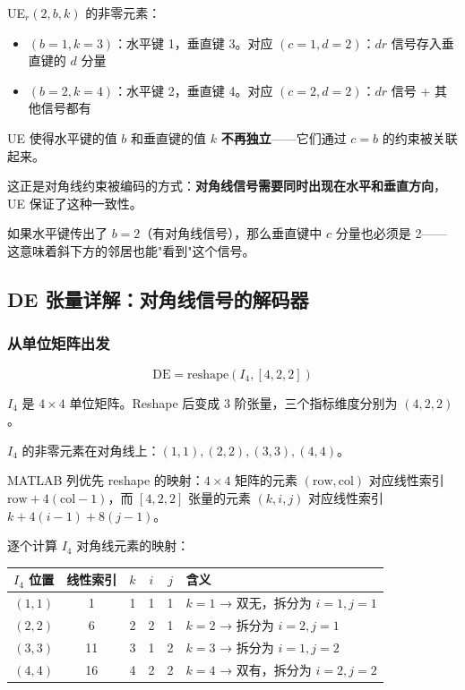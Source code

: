 \documentclass[12pt,a4paper]{article}
\begin{document}
\begin{exbox}[具体例子：当 $dr = 2$（有对角线信号，这里有皇后！）时]
UE$_r(2, b, k)$ 的非零元素：
\begin{itemize}
  \item $(b{=}1, k{=}3)$：水平键 1，垂直键 3。对应 $(c{=}1, d{=}2)$：$dr$ 信号存入垂直键的 $d$ 分量
  \item $(b{=}2, k{=}4)$：水平键 2，垂直键 4。对应 $(c{=}2, d{=}2)$：$dr$ 信号 + 其他信号都有
\end{itemize}
\end{exbox}

\begin{warnbox}
UE 使得水平键的值 $b$ 和垂直键的值 $k$ \textbf{不再独立}——它们通过 $c = b$ 的约束被关联起来。

这正是对角线约束被编码的方式：\textbf{对角线信号需要同时出现在水平和垂直方向}，UE 保证了这种一致性。

如果水平键传出了 $b=2$（有对角线信号），那么垂直键中 $c$ 分量也必须是 2——这意味着斜下方的邻居也能"看到"这个信号。
\end{warnbox}

\subsection{DE 张量详解：对角线信号的解码器}

\subsubsection{从单位矩阵出发}

$$\text{DE} = \text{reshape}(I_4, [4, 2, 2])$$

$I_4$ 是 $4 \times 4$ 单位矩阵。Reshape 后变成 3 阶张量，三个指标维度分别为 $(4, 2, 2)$。

$I_4$ 的非零元素在对角线上：$(1,1), (2,2), (3,3), (4,4)$。

MATLAB 列优先 reshape 的映射：$4 \times 4$ 矩阵的元素 $(\text{row}, \text{col})$ 对应线性索引 $\text{row} + 4(\text{col}-1)$，而 $[4,2,2]$ 张量的元素 $(k, i, j)$ 对应线性索引 $k + 4(i-1) + 8(j-1)$。

逐个计算 $I_4$ 对角线元素的映射：

\begin{center}
\begin{tabular}{c|c|ccc|l}
\toprule
$I_4$ 位置 & 线性索引 & $k$ & $i$ & $j$ & 含义 \\
\midrule
$(1,1)$ & 1 & 1 & 1 & 1 & $k{=}1$ → 双无，拆分为 $i{=}1, j{=}1$ \\
$(2,2)$ & 6 & 2 & 2 & 1 & $k{=}2$ → 拆分为 $i{=}2, j{=}1$ \\
$(3,3)$ & 11 & 3 & 1 & 2 & $k{=}3$ → 拆分为 $i{=}1, j{=}2$ \\
$(4,4)$ & 16 & 4 & 2 & 2 & $k{=}4$ → 双有，拆分为 $i{=}2, j{=}2$ \\
\bottomrule
\end{tabular}
\end{center}
\end{document}
